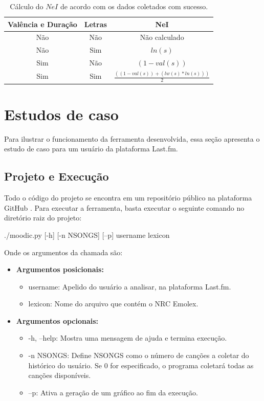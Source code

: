 \begin{table}[h]
	\centering
	\begin{tabular}{|c|c|c|}
		\hline
		\textbf{Valência e Duração} & \textbf{Letras} & \textbf{NeI} \\
		\hline
		Não & Não & Não calculado \\ \hline
		Não & Sim & $ ln(s) $ \\ \hline
		Sim & Não & $ (1 - val(s)) $ \\ \hline
		Sim & Sim & $ \frac{((1 - val(s)) + (lw(s) * ln(s)))}{2} $ \\ \hline 
	\end{tabular}
	\caption{\label{tab:nei} Cálculo do $ NeI $ de acordo com os dados
	coletados com sucesso.}
\end{table}

\section{Estudos de caso}

Para ilustrar o funcionamento da ferramenta desenvolvida, essa seção
apresenta o estudo de caso para um usuário da plataforma Last.fm.

\subsection{Projeto e Execução}

Todo o código do projeto se encontra em um repositório público na
plataforma GitHub \cite{projectgit}. Para executar a ferramenta, basta
executar o seguinte comando no diretório raiz do projeto:

\begin{center}
	./moodic.py [-h] [-n NSONGS] [--p] username lexicon
\end{center}

Onde os argumentos da chamada são:

\begin{itemize}
	\item \textbf{Argumentos posicionais:}

	\begin{itemize}
		\item username: Apelido do usuário a analisar, na plataforma
		Last.fm.
		\item lexicon: Nome do arquivo que contém o NRC Emolex.
	\end{itemize}

	\item \textbf{Argumentos opcionais:}

	\begin{itemize}
		\item -h, --help: Mostra uma mensagem de ajuda e termina
		execução.
		\item -n NSONGS: Define NSONGS como o número de canções a 
		coletar do histórico do usuário. Se $ 0 $ for especificado,
		o programa coletará todas as canções disponíveis.
		\item --p: Ativa a geração de um gráfico ao fim da execução.
	\end{itemize}
\end{itemize}

